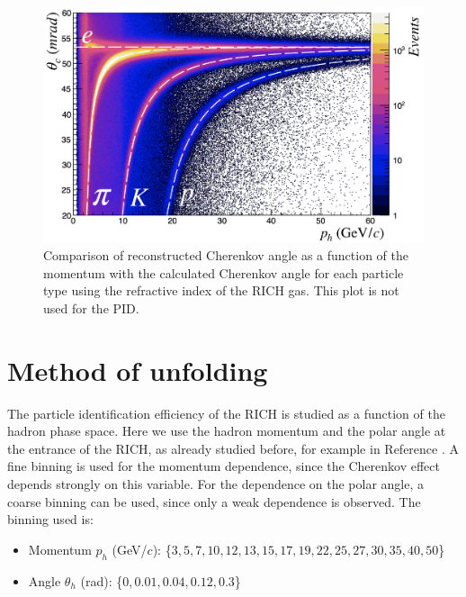 \begin{figure}[!h]
  \centering
	\includegraphics[scale=0.45]{./gfx/RICHIndices.png}
	\caption{Comparison of reconstructed Cherenkov angle as a function of the momentum with the calculated Cherenkov angle for each particle type using the refractive index of the RICH gas. This plot is not used for the PID.}
	\label{pic:RefIndex}
\end{figure}

\section{Method of unfolding}

The particle identification efficiency of the RICH is studied as a function of the hadron phase space. Here we use the hadron momentum and the polar angle at the entrance of the RICH, as already studied before, for example in Reference \cite{Curiel}. A fine binning is used for the momentum dependence, since the Cherenkov effect depends strongly on this variable. For the dependence on the polar angle, a coarse binning can be used, since only a weak dependence is observed. The binning used is:

\begin{itemize}
  \item Momentum $p_h$ (GeV/$c$): \{$3,5,7,10,12,13,15,17,19,22,25,27,30,35,40,50$\}
  \item Angle $\theta_h$ (rad): \{$0,0.01,0.04,0.12,0.3$\}
\end{itemize}

